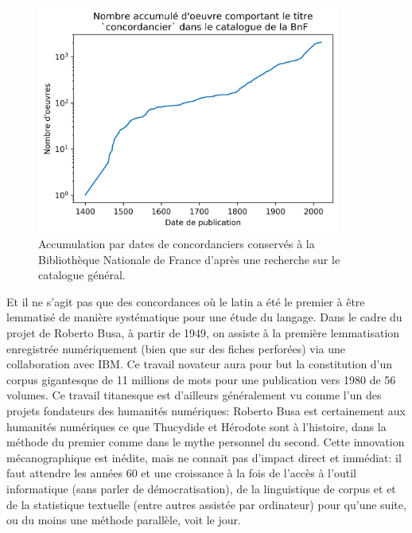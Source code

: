\begin{figure}[h]
    \centering
    \includegraphics[width=10cm]{figures/chap3/histoire/concordanciers.png}
    \caption{Accumulation par dates de concordanciers conservés à la Bibliothèque Nationale de France d'après une recherche sur le catalogue général.}
    \label{lemmatisation:concordanciers}
\end{figure}

Et il ne s'agit pas que des concordances où le latin a été le premier à être lemmatisé de manière systématique pour une étude du langage. Dans le cadre du projet de Roberto Busa, à partir de 1949, on assiste à la première lemmatisation enregistrée numériquement (bien que sur des fiches perforées) via une collaboration avec IBM. Ce travail novateur aura pour but la constitution d'un corpus gigantesque de 11 millions de mots pour une publication vers 1980 de 56 volumes. Ce travail titanesque est d'ailleurs généralement vu comme l'un des projets fondateurs des humanités numériques: Roberto Busa est certainement aux humanités numériques ce que Thucydide et Hérodote sont à l'histoire, dans la méthode du premier comme dans le mythe personnel du second. Cette innovation mécanographique est inédite, mais ne connait pas d'impact direct et immédiat: il faut attendre les années 60 et une  croissance à la fois de l'accès à l'outil informatique (sans parler de démocratisation), de la linguistique de corpus et et de la statistique textuelle (entre autres assistée par ordinateur) pour qu'une suite, ou du moins une méthode parallèle, voit le jour. 

